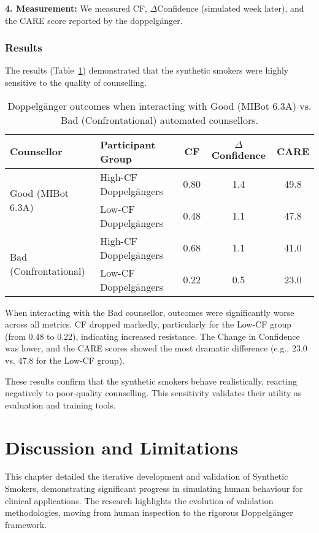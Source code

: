 \textbf{4. Measurement:} We measured CF, $\Delta$Confidence (simulated week later), and the CARE score reported by the doppelgänger.

\subsubsection{Results}

The results (Table~\ref{tab:good-vs-bad-counselling}) demonstrated that the synthetic smokers were highly sensitive to the quality of counselling.

\begin{table}[h!]
\centering
\caption{Doppelgänger outcomes when interacting with Good (MIBot 6.3A) vs. Bad (Confrontational) automated counsellors.}
\label{tab:good-vs-bad-counselling}
\begin{tabular}{@{}llccc@{}}
\toprule
\textbf{Counsellor} & \textbf{Participant Group} & \textbf{CF} & \textbf{$\Delta$Confidence} & \textbf{CARE} \\ \midrule
\multirow{2}{*}{Good (MIBot 6.3A)} & High-CF Doppelgängers & 0.80 & 1.4 & 49.8 \\
 & Low-CF Doppelgängers & 0.48 & 1.1 & 47.8 \\ \midrule
\multirow{2}{*}{Bad (Confrontational)} & High-CF Doppelgängers & 0.68 & 1.1 & 41.0 \\
 & Low-CF Doppelgängers & 0.22 & 0.5 & 23.0 \\ \bottomrule
\end{tabular}
\end{table}

When interacting with the Bad counsellor, outcomes were significantly worse across all metrics. CF dropped markedly, particularly for the Low-CF group (from 0.48 to 0.22), indicating increased resistance. The Change in Confidence was lower, and the CARE scores showed the most dramatic difference (e.g., 23.0 vs. 47.8 for the Low-CF group).

These results confirm that the synthetic smokers behave realistically, reacting negatively to poor-quality counselling. This sensitivity validates their utility as evaluation and training tools.

\section{Discussion and Limitations}

This chapter detailed the iterative development and validation of Synthetic Smokers, demonstrating significant progress in simulating human behaviour for clinical applications. The research highlights the evolution of validation methodologies, moving from human inspection to the rigorous Doppelgänger framework.

